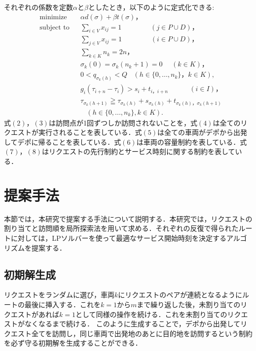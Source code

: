 \documentclass[a4j,11pt,twocolumn]{jsarticle}
\begin{document}
それぞれの係数を定数$\alpha$と$\beta$としたとき，以下のように定式化できる:
\begin{align*}
  &\textrm{minimize}   &&
  \alpha d(\sigma)+ \beta t(\sigma)，\tag{1}\\
  &\textrm{subject to} && \sum_{i \in V} x_{ij} = 1 \ \ \ \ \ \ \ \ \ \ \ \ \ \ \ \ \ \ \ (j \in  P \cup D)，\tag{2}\\
  &                    && \sum_{j \in V} x_{ij} = 1 \ \ \ \ \ \ \ \ \ \ \ \ \ \ \ \ \ \ \ (i \in  P \cup D)，\tag{3}\\
  &                    && \sum_{k \in K} n_k = 2n，\tag{4}\\
  &                    && \sigma_k(0) = \sigma_k(n_k+1) = 0 \ \ \ \ \ \ (k \in K)，\tag{5}\\
  &                    && 0 < q_{\sigma_k(h)} < Q\ \ \ \
  (h \in \{0, ... ,n_k\}，k \in K), \tag{6}\\
  &                    && g_i(\tau_{i+n}-\tau_i) > s_i + t_{i，i+n}\ \ \ \ \ \ \ \ \ \ \ \ \ \  (i \in I)，\tag{7}\\
  &                    && \tau_ {\sigma_k (h+1)} \geqq \tau_ {\sigma_k (h)} + s_{\sigma_k (h)} + t_ {\sigma_k (h)，\sigma_k (h+1)}\\
  &                    &&  \ \ \ \ (h \in \{0, ... ,n_k\},k \in K).\tag{8}
\end{align*}
式$(2)，(3)$は訪問点が1回ずつしか訪問されないことを，式$(4)$は全てのリクエストが実行されることを表している．式$(5)$は全ての車両がデポから出発してデポに帰ることを表している．式$(6)$は車両の容量制約を表している．式$(7)，(8)$はリクエストの先行制約とサービス時刻に関する制約を表している．

\section{提案手法}
本節では，本研究で提案する手法について説明する．本研究では，リクエストの割り当てと訪問順を局所探索法を用いて求める．それぞれの反復で得られたルートに対しては，LPソルバーを使って最適なサービス開始時刻を決定するアルゴリズムを提案する．

\subsection{{\large 初期解生成}}
リクエストをランダムに選び，車両$k$にリクエストのペアが連続となるようにルートの最後に挿入する．これを$k = 1 から m$まで繰り返した後，未割り当てのリクエストがあれば$k = 1 $として同様の操作を続ける．これを未割り当てのリクエストがなくなるまで続ける．
このように生成することで，デポから出発してリクエスト全てを訪問し，同じ車両で出発地のあとに目的地を訪問するという制約を必ず守る初期解を生成することができる．
\end{document}
